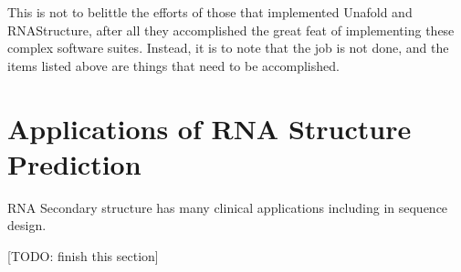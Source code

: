 This is not to belittle the efforts of those that implemented Unafold
and RNAStructure, after all they accomplished the great feat of
implementing these complex software suites. Instead, it is to note
that the job is not done, and the items listed above are things that
need to be accomplished.

\section{Applications of RNA Structure Prediction}

RNA Secondary structure has many clinical applications including in
sequence design.

[TODO: finish this section]


